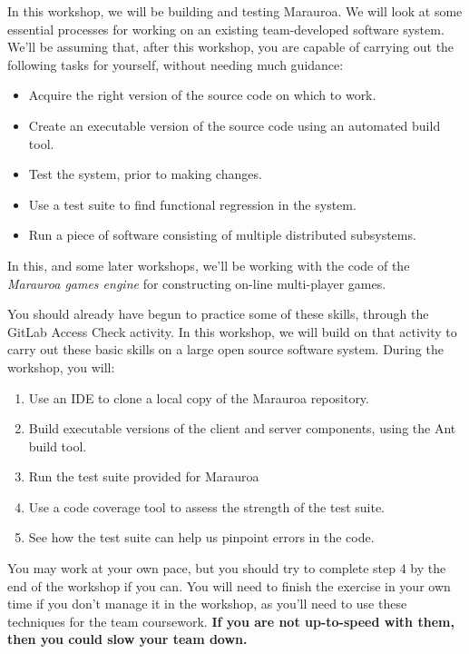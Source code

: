 \documentclass[
]{book}
\providecommand{\tightlist}{%
  \setlength{\itemsep}{0pt}\setlength{\parskip}{0pt}}
\begin{document}
In this workshop, we will be building and testing Marauroa. We will look at some essential processes for working on an existing team-developed software system. We'll be assuming that, after this workshop, you are capable of carrying out the following tasks for yourself, without needing much guidance:

\begin{itemize}
\tightlist
\item
  Acquire the right version of the source code on which to work.
\item
  Create an executable version of the source code using an automated build tool.
\item
  Test the system, prior to making changes.
\item
  Use a test suite to find functional regression in the system.\\
\item
  Run a piece of software consisting of multiple distributed subsystems.
\end{itemize}

In this, and some later workshops, we'll be working with the code of the \emph{Marauroa games engine} for constructing on-line multi-player games.

You should already have begun to practice some of these skills, through the GitLab Access Check activity.
In this workshop, we will build on that activity to carry out these basic skills on a large open source software system. During the workshop, you will:

\begin{enumerate}
\def\labelenumi{\arabic{enumi}.}
\tightlist
\item
  Use an IDE to clone a local copy of the Marauroa repository.
\item
  Build executable versions of the client and server components, using the Ant build tool.
\item
  Run the test suite provided for Marauroa
\item
  Use a code coverage tool to assess the strength of the test suite.
\item
  See how the test suite can help us pinpoint errors in the code.
\end{enumerate}

You may work at your own pace, but you should try to complete step 4 by the end of the workshop if you can. You will need to finish the exercise in your own time if you don't manage it in the workshop, as you'll need to use these techniques for the team coursework. \textbf{If you are not up-to-speed with them, then you could slow your team down.}
\end{document}
